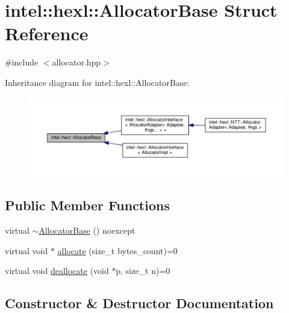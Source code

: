 \hypertarget{structintel_1_1hexl_1_1AllocatorBase}{}\section{intel\+:\+:hexl\+:\+:Allocator\+Base Struct Reference}
\label{structintel_1_1hexl_1_1AllocatorBase}


{\ttfamily \#include $<$allocator.\+hpp$>$}



Inheritance diagram for intel\+:\+:hexl\+:\+:Allocator\+Base\+:
\nopagebreak
\begin{figure}[H]
\begin{center}
\leavevmode
\includegraphics[width=350pt]{structintel_1_1hexl_1_1AllocatorBase__inherit__graph}
\end{center}
\end{figure}
\subsection*{Public Member Functions}
\begin{DoxyCompactItemize}
\item 
virtual \hyperlink{structintel_1_1hexl_1_1AllocatorBase_ac8a2afdc70cef8b7c9342aa2281ea4d5}{$\sim$\+Allocator\+Base} () noexcept
\item 
virtual void $\ast$ \hyperlink{structintel_1_1hexl_1_1AllocatorBase_aadf587e7617fbace2e9d3b4f9d9e8af0}{allocate} (size\+\_\+t bytes\+\_\+count)=0
\item 
virtual void \hyperlink{structintel_1_1hexl_1_1AllocatorBase_a0f03686f9b78728d4d228ceaf4c2948e}{deallocate} (void $\ast$p, size\+\_\+t n)=0
\end{DoxyCompactItemize}


\subsection{Constructor \& Destructor Documentation}
\mbox{\label{structintel_1_1hexl_1_1AllocatorBase_ac8a2afdc70cef8b7c9342aa2281ea4d5}} 
